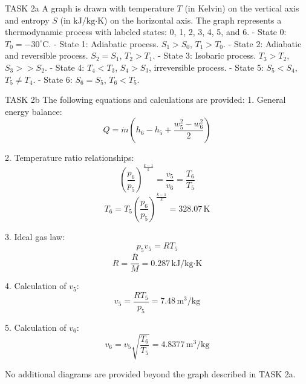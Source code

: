 TASK 2a  
A graph is drawn with temperature \( T \) (in Kelvin) on the vertical axis and entropy \( S \) (in \( \text{kJ}/\text{kg·K} \)) on the horizontal axis. The graph represents a thermodynamic process with labeled states: 0, 1, 2, 3, 4, 5, and 6.  
- State 0: \( T_0 = -30^\circ\text{C} \).  
- State 1: Adiabatic process. \( S_1 > S_0 \), \( T_1 > T_0 \).  
- State 2: Adiabatic and reversible process. \( S_2 = S_1 \), \( T_2 > T_1 \).  
- State 3: Isobaric process. \( T_3 > T_2 \), \( S_3 >> S_2 \).  
- State 4: \( T_4 < T_3 \), \( S_4 > S_3 \), irreversible process.  
- State 5: \( S_5 < S_4 \), \( T_5 \neq T_4 \).  
- State 6: \( S_6 = S_5 \), \( T_6 < T_5 \).  

TASK 2b  
The following equations and calculations are provided:  
1. General energy balance:  
\[
Q = \dot{m} \left( h_6 - h_5 + \frac{w_5^2 - w_6^2}{2} \right)
\]  

2. Temperature ratio relationships:  
\[
\left( \frac{p_6}{p_5} \right)^{\frac{k-1}{k}} = \frac{v_5}{v_6} = \frac{T_6}{T_5}
\]  
\[
T_6 = T_5 \left( \frac{p_6}{p_5} \right)^{\frac{k-1}{k}} = 328.07 \, \text{K}
\]  

3. Ideal gas law:  
\[
p_5 v_5 = R T_5
\]  
\[
R = \frac{\bar{R}}{M} = 0.287 \, \text{kJ}/\text{kg·K}
\]  

4. Calculation of \( v_5 \):  
\[
v_5 = \frac{R T_5}{p_5} = 7.48 \, \text{m}^3/\text{kg}
\]  

5. Calculation of \( v_6 \):  
\[
v_6 = v_5 \sqrt{\frac{T_6}{T_5}} = 4.8377 \, \text{m}^3/\text{kg}
\]  

No additional diagrams are provided beyond the graph described in TASK 2a.